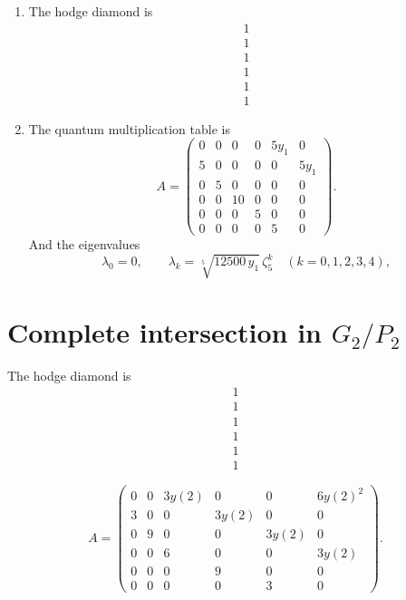 \documentclass[11pt]{amsart}
\newcounter{num}[section] %
\begin{document}
\begin{enumerate}
    \item [1)]The hodge diamond is
    \[
        \begin{array}{c}
            1   \\
             1\\
             1\\
             1\\
             1\\
             1
        \end{array}
    \]

    \item[2)] The quantum multiplication table is
    \[
A=
\begin{pmatrix}
0 & 0 & 0 & 0 & 5y_1 & 0 \\
5 & 0 & 0 & 0 & 0 & 5y_1 \\
0 & 5 & 0 & 0 & 0 & 0 \\
0 & 0 & 10 & 0 & 0 & 0 \\
0 & 0 & 0 & 5 & 0 & 0 \\
0 & 0 & 0 & 0 & 5 & 0
\end{pmatrix}.
\]
And the eigenvalues
\[
\lambda_0=0,
\qquad
\lambda_k=\sqrt[5]{12500\,y_1}\,\zeta_5^k
\quad (k=0,1,2,3,4),
\]
\end{enumerate}

\section{Complete intersection in $G_2/P_2$}
The hodge diamond is
    \[
        \begin{array}{c}
            1   \\
             1\\
             1\\
             1\\
             1\\
             1
        \end{array}
    \]

\[
A=
\begin{pmatrix}
0 & 0 & 3y(2) & 0 & 0 & 6y(2)^2\\
3 & 0 & 0 & 3y(2) & 0 & 0\\
0 & 9 & 0 & 0 & 3y(2) & 0\\
0 & 0 & 6 & 0 & 0 & 3y(2)\\
0 & 0 & 0 & 9 & 0 & 0\\
0 & 0 & 0 & 0 & 3 & 0
\end{pmatrix}.
\]
\end{document}
